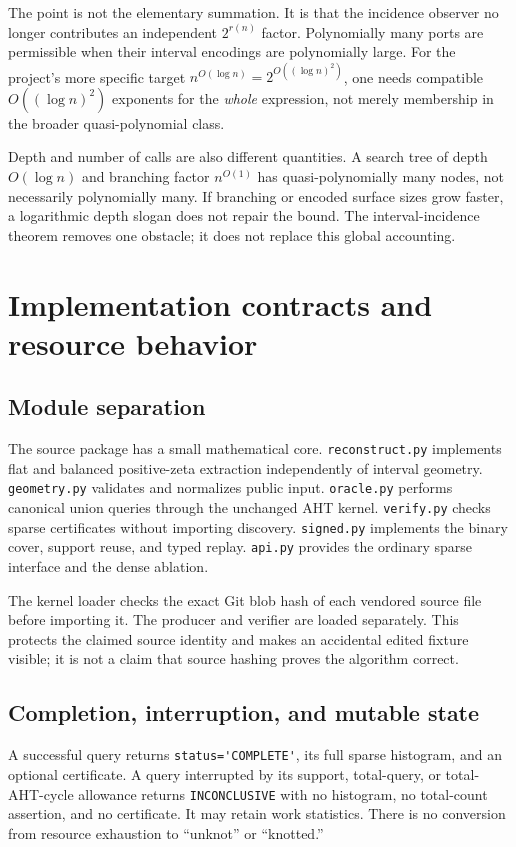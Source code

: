 \documentclass[11pt,letterpaper]{article}
\newcommand{\code}[1]{\nolinkurl{#1}}
\begin{document}
The point is not the elementary summation. It is that the incidence observer
no longer contributes an independent $2^{r(n)}$ factor. Polynomially many
ports are permissible when their interval encodings are polynomially large.
For the project's more specific target $n^{O(\log n)}=2^{O((\log n)^2)}$,
one needs compatible $O((\log n)^2)$ exponents for the \emph{whole} expression,
not merely membership in the broader quasi-polynomial class.

Depth and number of calls are also different quantities. A search tree of
depth $O(\log n)$ and branching factor $n^{O(1)}$ has quasi-polynomially many
nodes, not necessarily polynomially many. If branching or encoded surface
sizes grow faster, a logarithmic depth slogan does not repair the bound.
The interval-incidence theorem removes one obstacle; it does not replace
this global accounting.

\section{Implementation contracts and resource behavior}
\label{sec:implementation}

\subsection{Module separation}
The source package has a small mathematical core. \code{reconstruct.py}
implements flat and balanced positive-zeta extraction independently of
interval geometry. \code{geometry.py} validates and normalizes public input.
\code{oracle.py} performs canonical union queries through the unchanged AHT
kernel. \code{verify.py} checks sparse certificates without importing discovery.
\code{signed.py} implements the binary cover, support reuse, and typed replay.
\code{api.py} provides the ordinary sparse interface and the dense ablation.

The kernel loader checks the exact Git blob hash of each vendored source file
before importing it. The producer and verifier are loaded separately. This
protects the claimed source identity and makes an accidental edited fixture
visible; it is not a claim that source hashing proves the algorithm correct.

\subsection{Completion, interruption, and mutable state}
A successful query returns \code{status='COMPLETE'}, its full sparse histogram,
and an optional certificate. A query interrupted by its support, total-query,
or total-AHT-cycle allowance returns \code{INCONCLUSIVE} with no histogram,
no total-count assertion, and no certificate. It may retain work statistics.
There is no conversion from resource exhaustion to ``unknot'' or ``knotted.''
\end{document}
